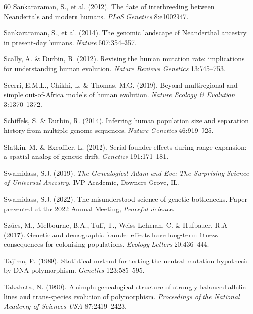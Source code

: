 \begin{thebibliography}{60}
Sankararaman, S., et al. (2012). The date of interbreeding between
Neandertals and modern humans. \emph{PLoS Genetics} 8:e1002947.

Sankararaman, S., et al. (2014). The genomic landscape of Neanderthal
ancestry in present-day humans. \emph{Nature} 507:354--357.

Scally, A. \& Durbin, R. (2012). Revising the human mutation rate:
implications for understanding human evolution. \emph{Nature Reviews
Genetics} 13:745--753.

Scerri, E.M.L., Chikhi, L. \& Thomas, M.G. (2019). Beyond multiregional
and simple out-of-Africa models of human evolution. \emph{Nature Ecology
\& Evolution} 3:1370--1372.

Schiffels, S. \& Durbin, R. (2014). Inferring human population size and
separation history from multiple genome sequences. \emph{Nature Genetics}
46:919--925.

Slatkin, M. \& Excoffier, L. (2012). Serial founder effects during range
expansion: a spatial analog of genetic drift. \emph{Genetics}
191:171--181.

Swamidass, S.J. (2019). \emph{The Genealogical Adam and Eve: The Surprising
Science of Universal Ancestry}. IVP Academic, Downers Grove, IL.

Swamidass, S.J. (2022). The misunderstood science of genetic bottlenecks.
Paper presented at the 2022 Annual Meeting; \emph{Peaceful Science}.

Sz\'ucs, M., Melbourne, B.A., Tuff, T., Weiss-Lehman, C. \& Hufbauer,
R.A. (2017). Genetic and demographic founder effects have long-term
fitness consequences for colonising populations. \emph{Ecology Letters}
20:436--444.

Tajima, F. (1989). Statistical method for testing the neutral mutation
hypothesis by DNA polymorphism. \emph{Genetics} 123:585--595.

Takahata, N. (1990). A simple genealogical structure of strongly balanced
allelic lines and trans-species evolution of polymorphism.
\emph{Proceedings of the National Academy of Sciences USA} 87:2419--2423.


\end{thebibliography}

